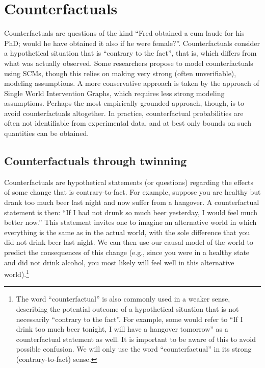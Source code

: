 \section{Counterfactuals}

Counterfactuals are questions of the kind ``Fred obtained a cum laude for his PhD; would he have obtained it also if he were female?''.
Counterfactuals consider a hypothetical situation that is ``contrary to the fact'', that is, which differs from what was actually observed.
Some researchers propose to model counterfactuals using SCMs, though this relies on making very strong (often unverifiable), modeling assumptions.
A more conservative approach is taken by the approach of Single World Intervention Graphs, which requires less strong modeling assumptions.
Perhaps the most empirically grounded approach, though, is to avoid counterfactuals altogether.
In practice, counterfactual probabilities are often not identifiable from experimental data, and at best only bounds on such quantities can be obtained.

\subsection{Counterfactuals through twinning}\label{sec:counterfactuals}

Counterfactuals are hypothetical statements (or questions) regarding the effects of some change that is contrary-to-fact.
For example, suppose you are healthy but drank too much beer last night and now suffer from a hangover. 
A counterfactual statement is then: ``If I had not drunk so much beer yesterday, I would feel much better now.''
This statement invites one to imagine an alternative world in which everything is the same as in the actual world,
with the sole difference that you did not drink beer last night. We can then use our causal model of the world to predict the
consequences of this change (e.g., since you were in a healthy state and did not drink alcohol, you most likely will
feel well in this alternative world).\footnote{The word ``counterfactual'' is also commonly used in a weaker sense, describing the potential outcome of a hypothetical situation that is not necessarily ``contrary to the fact''. For example, some would refer to ``If I drink too much beer tonight, I will have a hangover tomorrow'' as a counterfactual statement as well.
It is important to be aware of this to avoid possible confusion. We will only use the word ``counterfactual'' in its strong (contrary-to-fact) sense.}


